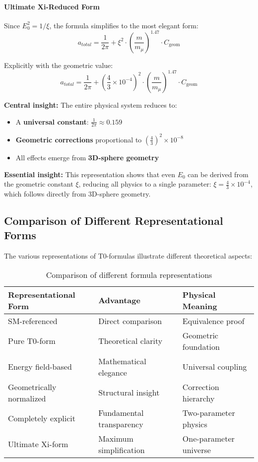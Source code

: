 \documentclass[12pt,a4paper]{article}
\numberwithin{equation}{section}
\newcommand{\xipar}{\xi}
\newcommand{\Cgeom}{C_{\text{geom}}}
\newcommand{\mmu}{m_{\mu}}
\begin{document}
\paragraph{Ultimate Xi-Reduced Form}
	
	
	Since $E_0^2 = 1/\xipar$, the formula simplifies to the most elegant form:
	\begin{equation}
		\boxed{a_{total} = \frac{1}{2\pi} + \xipar^2 \cdot \left(\frac{m}{\mmu}\right)^{1.47} \cdot \Cgeom}
	\end{equation}
	
	Explicitly with the geometric value:
	\begin{equation}
		\boxed{a_{total} = \frac{1}{2\pi} + \left(\frac{4}{3} \times 10^{-4}\right)^2 \cdot \left(\frac{m}{\mmu}\right)^{1.47} \cdot \Cgeom}
	\end{equation}
	
	\textbf{Central insight:} The entire physical system reduces to:
	\begin{itemize}
		\item A \textbf{universal constant}: $\frac{1}{2\pi} \approx 0.159$
		\item \textbf{Geometric corrections} proportional to $\left(\frac{4}{3}\right)^2 \times 10^{-8}$
		\item All effects emerge from \textbf{3D-sphere geometry}
	\end{itemize}
	
	\textbf{Essential insight:} This representation shows that even $E_0$ can be derived from the geometric constant $\xipar$, reducing all physics to a single parameter: $\xipar = \frac{4}{3} \times 10^{-4}$, which follows directly from 3D-sphere geometry.
	
	\subsection{Comparison of Different Representational Forms}
	
	The various representations of T0-formulas illustrate different theoretical aspects:
	
	\begin{table}[H]
		\centering
		\begin{tabular}{lll}
			\toprule
			\textbf{Representational Form} & \textbf{Advantage} & \textbf{Physical Meaning} \\
			\midrule
			SM-referenced & Direct comparison & Equivalence proof \\
			Pure T0-form & Theoretical clarity & Geometric foundation \\
			Energy field-based & Mathematical elegance & Universal coupling \\
			Geometrically normalized & Structural insight & Correction hierarchy \\
			Completely explicit & Fundamental transparency & Two-parameter physics \\
			Ultimate Xi-form & Maximum simplification & One-parameter universe \\
			\bottomrule
		\end{tabular}
		\caption{Comparison of different formula representations}
		\label{tab:formula_comparison}
	\end{table}
	
\end{document}
